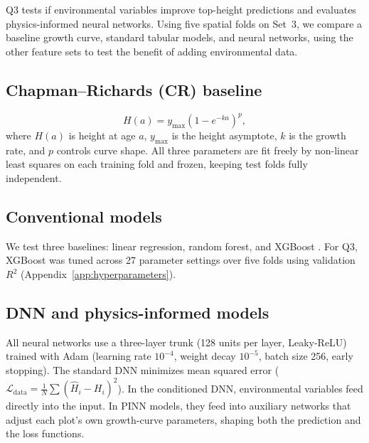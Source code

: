 Q3 tests if environmental variables improve top-height predictions and evaluates physics-informed neural networks. Using five spatial folds on Set~3, we compare a baseline growth curve, standard tabular models, and neural networks, using the other feature sets to test the benefit of adding environmental data.

\subsection{Chapman--Richards (CR) baseline}
\begin{equation}
H(a) = y_{\max}\left(1 - e^{-ka}\right)^p,
\label{eq:cr}
\end{equation}
where $H(a)$ is height at age $a$, $y_{\max}$ is the height asymptote, $k$ is the growth rate, and $p$ controls curve shape. All three parameters are fit freely by non-linear least squares on each training fold and frozen, keeping test folds fully independent.

\subsection*{Conventional models}
We test three baselines: linear regression, random forest, and XGBoost \cite{chen2016XGBoost_C4_NN}. For Q3, XGBoost was tuned across 27 parameter settings over five folds using validation $R^2$ (Appendix~\ref{app:hyperparameters}).

\subsection{DNN and physics-informed models}
All neural networks use a three-layer trunk (128 units per layer, Leaky-ReLU) trained with Adam (learning rate $10^{-4}$, weight decay $10^{-5}$, batch size 256, early stopping). The standard DNN minimizes mean squared error ($\mathcal{L}_{\mathrm{data}} = \frac{1}{N}\sum (\hat H_i-H_i)^2$). In the conditioned DNN, environmental variables feed directly into the input. In PINN models, they feed into auxiliary networks that adjust each plot's own growth-curve parameters, shaping both the prediction and the loss functions.

